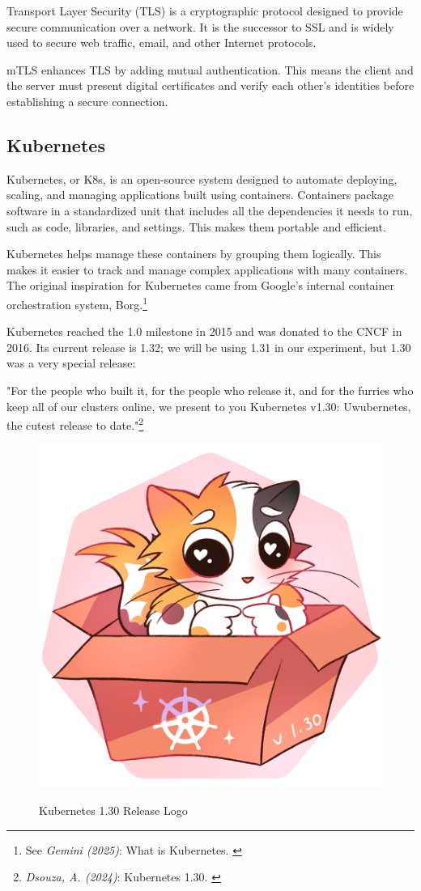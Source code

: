 Transport Layer Security (TLS) is a cryptographic protocol designed to provide secure communication over a network. It is the successor to SSL and is widely used to secure web traffic, email, and other Internet protocols.

mTLS enhances TLS by adding mutual authentication. This means the client and the server must present digital certificates and verify each other's identities before establishing a secure connection.

\subsection{Kubernetes}

Kubernetes, or K8s, is an open-source system designed to automate deploying, scaling, and managing applications built using containers. Containers package software in a standardized unit that includes all the dependencies it needs to run, such as code, libraries, and settings. This makes them portable and efficient.

Kubernetes helps manage these containers by grouping them logically. This makes it easier to track and manage complex applications with many containers. The original inspiration for Kubernetes came from Google's internal container orchestration system, Borg.\footnote{See \textit{Gemini (2025)}: What is Kubernetes. \cite{bardKubernetes}} 

Kubernetes reached the 1.0 milestone in 2015 and was donated to the CNCF in 2016. Its current release is 1.32; we will be using 1.31 in our experiment, but 1.30 was a very special release:

"For the people who built it, for the people who release it, and for the furries who keep all of our clusters online, we present to you Kubernetes v1.30: Uwubernetes, the cutest release to date."\footnote{\textit{Dsouza, A. (2024)}: Kubernetes 1.30. \cite{uwubernetes}}

\begin{figure}[H]
\centering
\caption {Kubernetes 1.30 Release Logo}
\includegraphics[width=0.3\linewidth]{images/k8s-1.30.png}
\label{fig:uwubernetes}
\end{figure}

